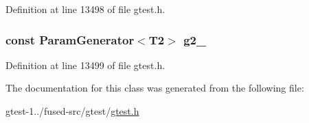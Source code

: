 \-Definition at line 13498 of file gtest.\-h.

\hypertarget{classtesting_1_1internal_1_1CartesianProductGenerator2_a4bd40d1fbb8c6d2895b5201e62afbe38}{
\subsubsection[{g2\-\_\-}]{\setlength{\rightskip}{0pt plus 5cm}const {\bf \-Param\-Generator}$<$\-T2$>$ {\bf g2\-\_\-}}}\label{d8/d34/classtesting_1_1internal_1_1CartesianProductGenerator2_a4bd40d1fbb8c6d2895b5201e62afbe38}


\-Definition at line 13499 of file gtest.\-h.



\-The documentation for this class was generated from the following file\-:\begin{DoxyCompactItemize}
\item 
gtest-\/1../fused-\/src/gtest/\hyperlink{fused-src_2gtest_2gtest_8h}{gtest.\-h}\end{DoxyCompactItemize}
